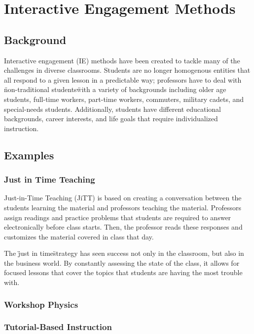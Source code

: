 \chapter[Chapter 3: Interactive Engagement Methods]{Interactive Engagement Methods}

\section{Background}

Interactive engagement (IE) methods have been created to tackle many of the challenges in diverse classrooms. Students are no longer homogenous entities that all respond to a given lesson in a predictable way; professors have to deal with \"non-traditional students\" with a variety of backgrounds including older age students, full-time workers, part-time workers, commuters, military cadets, and special-needs students. Additionally, students have different educational backgrounds, career interests, and life goals that require individualized instruction\cite{novak1999}.

\section{Examples}

\subsection{Just in Time Teaching}

Just-in-Time Teaching (JiTT) is based on creating a conversation between the students learning the material and professors teaching the material. Professors assign readings and practice problems that students are required to answer electronically before class starts. Then, the professor reads these responses and customizes the material covered in class that day\cite{novak1999}.

The \"just in time\" strategy has seen success not only in the classroom, but also in the business world. By constantly assessing the state of the class, it allows for focused lessons that cover the topics that students are having the most trouble with.

\subsection{Workshop Physics}
\subsection{Tutorial-Based Instruction}
